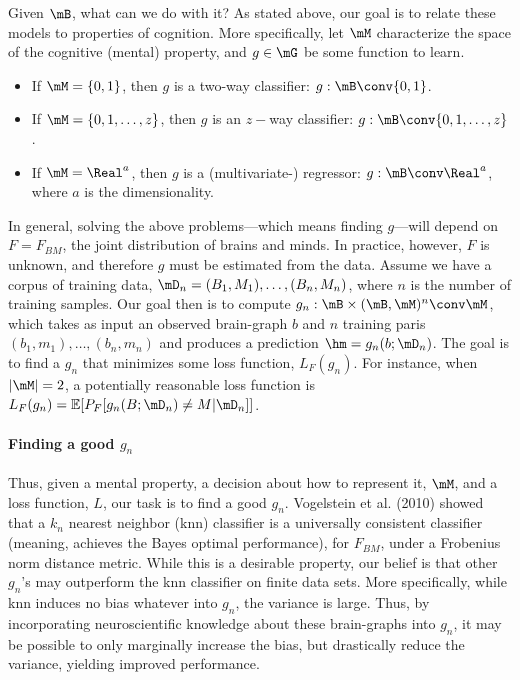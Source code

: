 Given $\mB$, what can we do with it?  As stated above, our goal is to relate these models to properties of cognition. More specifically, let $\mM$ characterize the space of the cognitive (mental) property, and $g \in \mG$ be some function to learn.  

\begin{itemize}
	\item If $\mM=\{0,1\}$, then $g$ is a two-way classifier: $g: \mB \conv \{0,1\}$.
	\item If $\mM=\{0,1,\ldots, z\}$, then $g$ is an $z-$way classifier: $g: \mB \conv \{0,1,\ldots,z\}$.
	\item If $\mM=\Real^a$, then $g$ is a (multivariate-) regressor: $g: \mB \conv \Real^a$, where $a$ is the dimensionality.  
\end{itemize}

In general, solving the above problems---which means finding $g$---will depend on $F=F_{BM}$, the joint distribution of brains and minds.  In practice, however, $F$ is unknown, and therefore $g$ must be estimated from the data. Assume we have a corpus of training data, $\mD_n=(B_1,M_1), \ldots, (B_n, M_n)$, where $n$ is the number of training samples.  Our goal then is to compute $g_n: \mB \times (\mB, \mM)^n \conv \mM$, which takes as input an observed brain-graph $b$ and $n$ training paris $(b_1,m_1), \ldots, (b_n,m_n)$ and produces a prediction $\hm=g_n(b; \mD_n)$.  The goal is to find a $g_n$ that minimizes some loss function, $L_F(g_n)$.  For instance, when $|\mM|=2$, a potentially reasonable loss function is $L_F(g_n)=\mathbb{E}[P_F[g_n(B;\mD_n) \neq M | \mD_n]]$.

\paragraph{Finding a good $g_n$}

Thus, given a mental property, a decision about how to represent it, $\mM$, and a loss function, $L$, our task is to find a good $g_n$.  Vogelstein et al. (2010) showed that a $k_n$ nearest neighbor (knn) classifier is a universally consistent classifier (meaning, achieves the Bayes optimal performance), for $F_{BM}$, under a Frobenius norm distance metric.  While this is a desirable property, our belief is that other $g_n$'s may outperform the knn classifier on finite data sets.  More specifically, while knn induces no bias whatever into $g_n$, the variance is large.  Thus, by incorporating neuroscientific knowledge about these brain-graphs into $g_n$, it may be possible to only marginally increase the bias, but drastically reduce the variance, yielding improved performance.  

